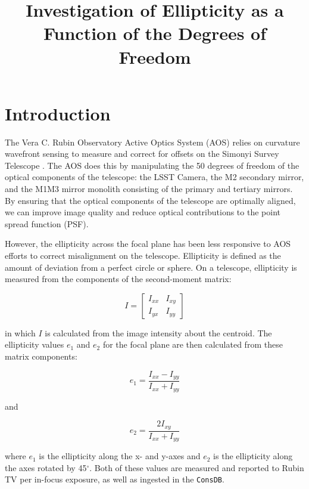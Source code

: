 \documentclass[SE,lsstdraft,authoryear,toc]{lsstdoc}
\title{Investigation of Ellipticity as a Function of the Degrees of Freedom}
\date{\vcsDate}
\begin{document}
\mkshorttitle  %

\section{Introduction}

The Vera C. Rubin Observatory Active Optics System (AOS) relies on curvature wavefront sensing to measure and correct for offsets on the Simonyi Survey Telescope \cite{Xin2015}. 
The AOS does this by manipulating the 50 degrees of freedom of the optical components of the telescope: the LSST Camera, the M2 secondary mirror, and the M1M3 mirror monolith consisting of the primary and tertiary mirrors. 
By ensuring that the optical components of the telescope are optimally aligned, we can improve image quality and reduce optical contributions to the point spread function (PSF). 

However, the ellipticity across the focal plane has been less responsive to AOS efforts to correct misalignment on the telescope. 
Ellipticity is defined as the amount of deviation from a perfect circle or sphere. 
On a telescope, ellipticity is measured from the components of the second-moment matrix:

\begin{equation}
    I = \begin{bmatrix} I_{xx} & I_{xy} \\ I_{yx} & I_{yy} \end{bmatrix}
\end{equation}

in which $I$ is calculated from the image intensity about the centroid. 
The ellipticity values $e_{1}$ and $e_{2}$ for the focal plane are then calculated from these matrix components:

\begin{equation}
    e_{1} = \frac{I_{xx}-I_{yy}}{I_{xx}+I_{yy}}
\end{equation}

and

\begin{equation}
    e_{2} = \frac{2 I_{xy}}{I_{xx}+I_{yy}}
\end{equation}

where $e_{1}$ is the ellipticity along the x- and y-axes and $e_{2}$ is the ellipticity along the axes rotated by 45$^{\circ}$. 
Both of these values are measured and reported to Rubin TV per in-focus exposure, as well as ingested in the \texttt{ConsDB}.
\end{document}
